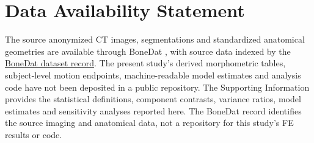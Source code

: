 \documentclass[11pt,a4paper]{article}
\begin{document}
\section*{Data Availability Statement}
The source anonymized CT images, segmentations and standardized anatomical geometries are available through BoneDat \citep{HenyssKuchar2025BoneDat}, with source data indexed by the \href{https://doi.org/10.5281/zenodo.15189761}{BoneDat dataset record}. The present study's derived morphometric tables, subject-level motion endpoints, machine-readable model estimates and analysis code have not been deposited in a public repository. The Supporting Information provides the statistical definitions, component contrasts, variance ratios, model estimates and sensitivity analyses reported here. The BoneDat record identifies the source imaging and anatomical data, not a repository for this study's FE results or code.



\end{document}
